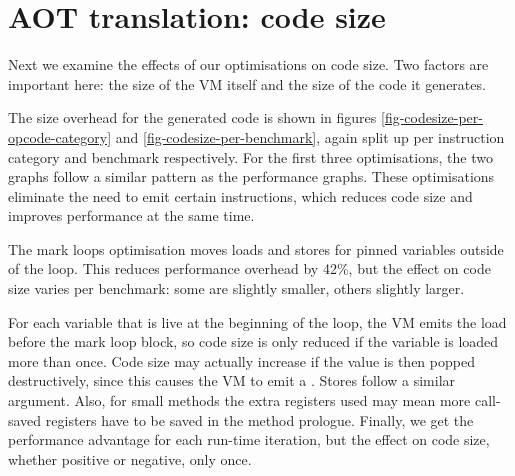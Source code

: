 

\section{AOT translation: code size}
\label{sec-evaluation-aot-translation-code-size}
Next we examine the effects of our optimisations on code size. Two factors are important here: the size of the VM itself and the size of the code it generates.

The size overhead for the generated code is shown in figures \ref{fig-codesize-per-opcode-category} and \ref{fig-codesize-per-benchmark}, again split up per instruction category and benchmark respectively. For the first three optimisations, the two graphs follow a similar pattern as the performance graphs. These optimisations eliminate the need to emit certain instructions, which reduces code size and improves performance at the same time.

The mark loops optimisation moves loads and stores for pinned variables outside of the loop. This reduces performance overhead by 42\%, but the effect on code size varies per benchmark: some are slightly smaller, others slightly larger.

For each variable that is live at the beginning of the loop, the VM emits the load before the mark loop block, so code size is only reduced if the variable is loaded more than once. Code size may actually increase if the value is then popped destructively, since this causes the VM to emit a . Stores follow a similar argument. Also, for small methods the extra registers used may mean more call-saved registers have to be saved in the method prologue. Finally, we get the performance advantage for each run-time iteration, but the effect on code size, whether positive or negative, only once.


